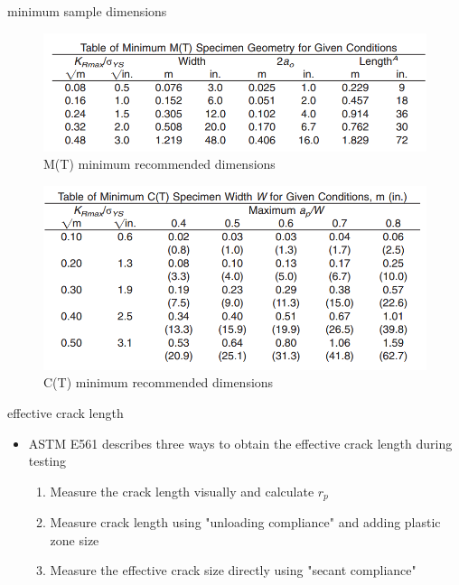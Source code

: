 \documentclass[10pt]{beamer}
\begin{document}
\begin{frame}{minimum sample dimensions}
	
\begin{figure}
\centering
\includegraphics[width=0.6\linewidth]{MT-minimum}
\caption{M(T) minimum recommended dimensions}
\label{fig:MT-minimum}
\end{figure}

\begin{figure}
\centering
\includegraphics[width=0.6\linewidth]{CT-minimum}
\caption{C(T) minimum recommended dimensions}
\label{fig:CT-minimum}
\end{figure}

\end{frame}

\begin{frame}{effective crack length}
	\begin{itemize}
		\item ASTM E561 describes three ways to obtain the effective crack length during testing
		\begin{enumerate}[<+->]
			\item Measure the crack length visually and calculate $r_p$
			\item Measure crack length using "unloading compliance" and adding plastic zone size
			\item Measure the effective crack size directly using "secant compliance"
		\end{enumerate}
	\end{itemize}
\end{frame}
\end{document}
